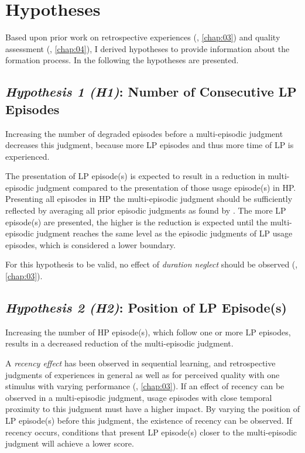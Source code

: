 \section{Hypotheses}
Based upon prior work on retrospective experiences (\cf, \autoref{chap:03}) and quality assessment (\cf, \autoref{chap:04}), I derived \unit[6]{hypotheses} to provide information about the formation process.
In the following the \unit[6]{hypotheses} are presented.

\subsection*{\emph{Hypothesis 1 (H1)}: Number of Consecutive \ac{LP} Episodes}
\begin{hypothesis}[H1]\label{hypo:number}
Increasing the number of degraded episodes before a multi-episodic judgment decreases this judgment, because more \ac{LP} episodes and thus more time of \ac{LP} is experienced.
\end{hypothesis}

The presentation of \ac{LP} episode(s) is expected to result in a reduction in multi-episodic judgment compared to the presentation of those usage episode(s) in \ac{HP}.
Presenting all episodes in \ac{HP} the multi-episodic judgment should be sufficiently reflected by averaging all prior episodic judgments as found by \cite{moller_single-call_2011}.
The more \ac{LP} episode(s) are presented, the higher is the reduction is expected until the multi-episodic judgment reaches the same level as the episodic judgments of \ac{LP} usage episodes, which is considered a lower boundary.

For this hypothesis to be valid, no effect of \emph{duration neglect} should be observed (\cf, \autoref{chap:03}).

\subsection*{\emph{Hypothesis 2 (H2)}: Position of \ac{LP} Episode(s)}
\begin{hypothesis}[H2]\label{hypo:position}
Increasing the number of \ac{HP} episode(s), which follow one or more \ac{LP} episodes, results in a decreased reduction of the multi-episodic judgment.
\end{hypothesis}

A \emph{recency effect} has been observed in sequential learning, and retrospective judgments of experiences in general as well as for perceived quality with one stimulus with varying performance (\cf, \autoref{chap:03}).
If an effect of recency can be observed in a multi-episodic judgment, usage episodes with close temporal proximity to this judgment must have a higher impact.
By varying the position of \ac{LP} episode(s) before this judgment, the existence of recency can be observed.
If recency occurs, conditions that present \ac{LP} episode(s) closer to the multi-episodic judgment will achieve a lower score.

